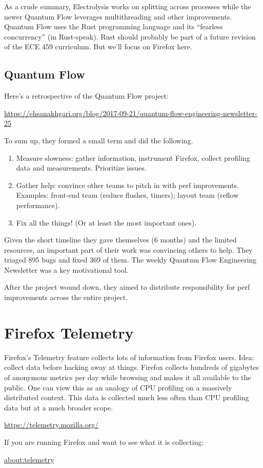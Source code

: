 \documentclass[a4paper]{report}
\begin{document}
As a crude summary, Electrolysis works on splitting across processes
while the newer Quantum Flow leverages multithreading and other
improvements.  Quantum Flow uses the Rust programming language and its
``fearless concurrency'' (in Rust-speak). Rust should probably be part
of a future revision of the ECE 459 curriculum. But we'll focus on
Firefox here.

\subsection*{Quantum Flow}
Here's a retrospective of the Quantum Flow project:
\begin{center}
\url{https://ehsanakhgari.org/blog/2017-09-21/quantum-flow-engineering-newsletter-25}
\end{center}

To sum up, they formed a small term and did the following.
\begin{enumerate}[noitemsep]
\item Measure slowness: gather information, instrument Firefox, collect profiling data and measurements. Prioritize issues.
\item Gather help: convince other teams to pitch in with perf improvements. Examples: front-end team (reduce flushes, timers); layout team (reflow performance).
\item Fix all the things! (Or at least the most important ones).
\end{enumerate}
Given the short timeline they gave themselves (6 months) and the limited resources, an important part of their work was convincing others to help.
They triaged 895 bugs and fixed 369 of them. The weekly Quantum Flow Engineering Newsletter was a key motivational tool.

After the project wound down, they aimed to distribute responsibility for perf improvements across the entire project.

\section*{Firefox Telemetry}
Firefox's Telemetry feature collects lots of information from Firefox
users.  Idea: collect data before hacking away at things.  Firefox collects hundreds of
gigabytes of anonymous metrics per day while browsing and makes it all available to
the public.  One can view this as an analogy of CPU profiling on a
massively distributed context. This data is collected much less often than
CPU profiling data but at a much broader scope.
\begin{center}
\url{https://telemetry.mozilla.org/}
\end{center}
If you are running Firefox and want to see what it is collecting:
\begin{center}
\url{about:telemetry}
\end{center}
\end{document}
